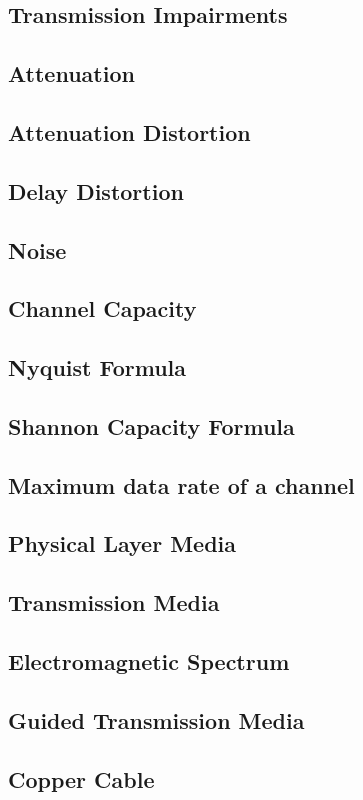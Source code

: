 \documentclass[11pt]{article}
\begin{document}
\subsection{Transmission Impairments}
\subsection{Attenuation}
\subsection{Attenuation Distortion}
\subsection{Delay Distortion}
\subsection{Noise}
\subsection{Channel Capacity}
\subsection{Nyquist Formula}
\subsection{Shannon Capacity Formula}
\subsection{Maximum data rate of a channel}
\subsection{Physical Layer Media}
\subsection{Transmission Media}
\subsection{Electromagnetic Spectrum}
\subsection{Guided Transmission Media}
\subsection{Copper Cable}
\end{document}
